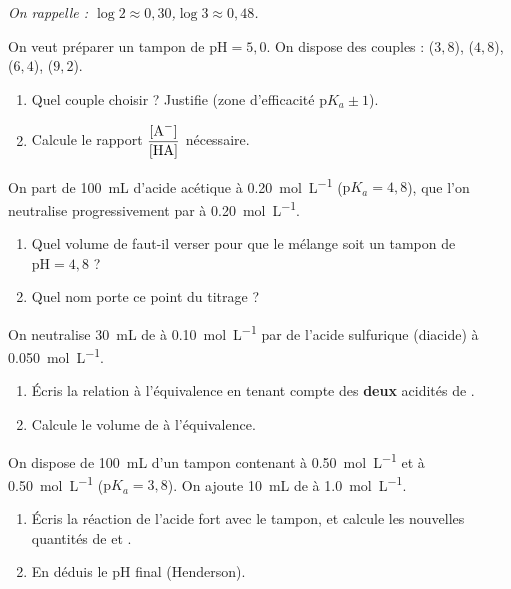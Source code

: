 \documentclass[11pt,a4paper]{article}
\begin{document}
\begin{center}\small\itshape On rappelle : $\log 2 \approx 0{,}30$,\quad $\log 3 \approx 0{,}48$.\end{center}

\begin{exo}
On veut préparer un tampon de $\mathrm{pH} = 5{,}0$. On dispose des couples :  ($3{,}8$),
 ($4{,}8$),  ($6{,}4$),  ($9{,}2$).
\begin{enumerate}[label=\alph*)]
  \item Quel couple choisir ? Justifie (zone d'efficacité $\mathrm{p}K_a \pm 1$).
  \item Calcule le rapport $\dfrac{[\ce{A-}]}{[\ce{HA}]}$ nécessaire.
\end{enumerate}
\end{exo}

\begin{exo}
On part de \qty{100}{mL} d'acide acétique  à \qty{0,20}{mol\per L} ($\mathrm{p}K_a = 4{,}8$), que
l'on neutralise progressivement par  à \qty{0,20}{mol\per L}.
\begin{enumerate}[label=\alph*)]
  \item Quel volume de  faut-il verser pour que le mélange soit un tampon de $\mathrm{pH} = 4{,}8$ ?
  \item Quel nom porte ce point du titrage ?
\end{enumerate}
\end{exo}

\begin{exo}
On neutralise \qty{30}{mL} de  à \qty{0,10}{mol\per L} par de l'acide sulfurique 
(diacide) à \qty{0,050}{mol\per L}.
\begin{enumerate}[label=\alph*)]
  \item Écris la relation à l'équivalence en tenant compte des \textbf{deux} acidités de .
  \item Calcule le volume de  à l'équivalence.
\end{enumerate}
\end{exo}

\begin{exo}
On dispose de \qty{100}{mL} d'un tampon contenant  à \qty{0,50}{mol\per L} et  à
\qty{0,50}{mol\per L} ($\mathrm{p}K_a = 3{,}8$). On ajoute \qty{10}{mL} de  à \qty{1,0}{mol\per L}.
\begin{enumerate}[label=\alph*)]
  \item Écris la réaction de l'acide fort avec le tampon, et calcule les nouvelles quantités de  et
        .
  \item En déduis le pH final (Henderson).
\end{enumerate}
\end{exo}
\end{document}
